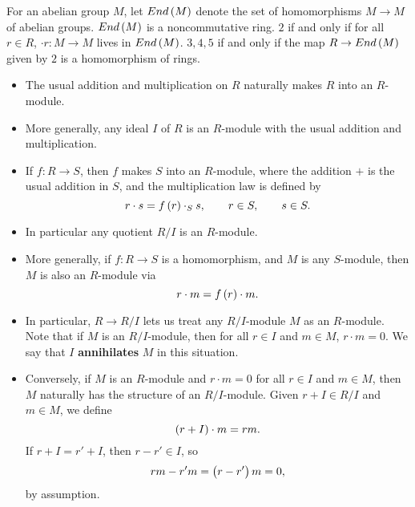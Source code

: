 \begin{note*}
For an abelian group $ M $, let $ End\br{M} $ denote the set of homomorphisms $ M \to M $ of abelian groups. $ End\br{M} $ is a noncommutative ring. $ 2 $ if and only if for all $ r \in R $, $ \cdot r : M \to M $ lives in $ End\br{M} $. $ 3, 4, 5 $ if and only if the map $ R \to End\br{M} $ given by $ 2 $ is a homomorphism of rings.
\end{note*}

\begin{example*}
\hfill
\begin{itemize}
\item The usual addition and multiplication on $ R $ naturally makes $ R $ into an $ R $-module.
\item More generally, any ideal $ I $ of $ R $ is an $ R $-module with the usual addition and multiplication.
\item If $ f : R \to S $, then $ f $ makes $ S $ into an $ R $-module, where the addition $ + $ is the usual addition in $ S $, and the multiplication law is defined by
$$ r \cdot s = f\br{r} \cdot_S s, \qquad r \in S, \qquad s \in S. $$
\item In particular any quotient $ R / I $ is an $ R $-module.
\item More generally, if $ f : R \to S $ is a homomorphism, and $ M $ is any $ S $-module, then $ M $ is also an $ R $-module via
$$ r \cdot m = f\br{r} \cdot m. $$
\item In particular, $ R \to R / I $ lets us treat any $ R / I $-module $ M $ as an $ R $-module. Note that if $ M $ is an $ R / I $-module, then for all $ r \in I $ and $ m \in M $, $ r \cdot m = 0 $. We say that $ I $ \textbf{annihilates} $ M $ in this situation.
\item Conversely, if $ M $ is an $ R $-module and $ r \cdot m = 0 $ for all $ r \in I $ and $ m \in M $, then $ M $ naturally has the structure of an $ R / I $-module. Given $ r + I \in R / I $ and $ m \in M $, we define
$$ \br{r + I} \cdot m = rm. $$
If $ r + I = r' + I $, then $ r - r' \in I $, so
$$ rm - r'm = \br{r - r'}m = 0, $$
by assumption.

\pagebreak


\end{itemize}
\end{example*}
